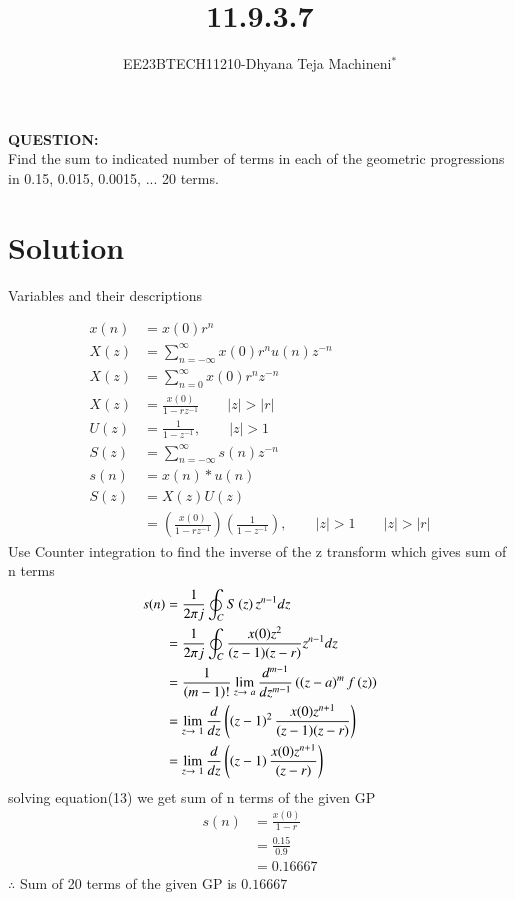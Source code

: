 \documentclass[journal,12pt,twocolumn]{IEEEtran}
\theoremstyle{remark}
\begin{document}

\vspace{3cm}
\title{\textbf{11.9.3.7}}
\author{EE23BTECH11210-Dhyana Teja Machineni$^{*}$%
}
\maketitle
\newpage
\bigskip

\textbf{QUESTION:}\\
Find the sum to indicated number of terms in each of the geometric progressions in
0.15, 0.015, 0.0015, ... 20 terms.
\section*{Solution}
 
\begin{flushleft}
     \begin{table}[h]
         \caption{Variables and their descriptions}
         \label{tab:table2}
         
     \end{table}
 \end{flushleft}
\begin{align}
x(n) &= x(0)r^n \\
X(z)&= \sum_{n=-\infty}^{\infty}x(0) r^n u(n) z^{-n}\\
X(z)&= \sum_{n=0}^{\infty}x(0) r^n z^{-n}\\
X(z) &= \frac{x(0)}{1-rz^{-1}} \qquad |z| > |r| \\
U(z)&=\frac{1}{1-z^{-1}}, \qquad |z|>1\\
S(z)&=\sum_{n=-\infty}^{\infty}s(n) z^{-n}\\
s(n)&= x(n)*u(n)\\
S(z)&=X(z)U(z)\\
&= \left( \frac{x(0)}{1-rz^{-1}}\right)\left(\frac{1}{1-z^{-1}} \right),\qquad |z| > 1  \qquad |z|>|r|
\end{align}
Use Counter integration to find the inverse of the z transform which gives sum of n terms
\begin{align}
s(n)&= \frac{1}{2\pi j}\oint_C S\brak{z}z^{n-1}dz\\
&=\frac{1}{2\pi j}\oint_C \frac{x(0) z^2}{(z-1)(z-r)}z^{n-1} dz\\
&= \frac{1}{\brak{m-1}!}\lim_{z\to\ a}\frac{d^{m-1}}{dz^{m-1}}\brak{\brak{z-a}^m f\brak{z}}\\
 &= \lim_{z\to \ 1}\frac{d}{dz}\brak{\brak{z-1}^2 \frac{x(0) z^{n+1}}{(z-1)(z-r)}}\\
 &=\lim_{z\to \ 1}\frac{d}{dz}\brak{\brak{z-1} \frac{x(0) z^{n+1}}{(z-r)}}
\end{align}
\hspace{0.5cm}    solving equation(13) we get sum of n terms of the given GP
\begin{align}
    s(n)&= \frac{x(0)}{1-r}\\
    &=\frac{0.15}{0.9}\\
    &=0.16667
\end{align}
        $\therefore$ Sum of 20 terms of the given GP is $0.16667$
       \renewcommand{\thefigure}{\theenumi}
 \renewcommand{\thetable}{\theenumi}
 
\end{document}
